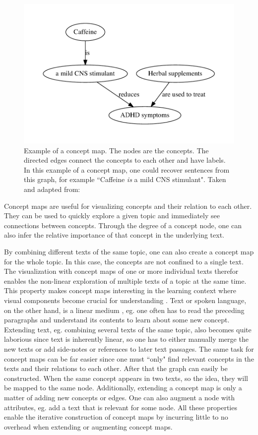 \begin{figure}[htb!]
\centering
\includegraphics[width=0.5\linewidth]{assets/figures/concept_map.pdf}
\caption[Example: Concept map]{Example of a concept map. The nodes are the concepts. The directed edges connect the concepts to each other and have labels. In this example of a concept map, one could recover sentences from this graph, for example ``Caffeine \textit{is} a mild CNS stimulant". Taken and adapted from: \cite{Falke2017b}}
\label{fig:concept_map}
\end{figure}

Concept maps are useful for visualizing concepts and their relation to each other.
They can be used to quickly explore a given topic and immediately see connections between concepts.
Through the degree of a concept node, one can also infer the relative importance of that concept in the underlying text.

By combining different texts of the same topic, one can also create a concept map for the whole topic.
In this case, the concepts are not confined to a single text.
The visualization with concept maps of one or more individual texts therefor enables the non-linear exploration of multiple texts of a topic at the same time.
This property makes concept maps interesting in the learning context where visual components become crucial for understanding \cite{Novak1984}.
Text or spoken language, on the other hand, is a linear medium \cite[p.~54]{Novak1984}, eg. one often has to read the preceding paragraphs and understand its contents to learn about some new concept.
Extending text, eg. combining several texts of the same topic, also becomes quite laborious since text is inherently linear, so one has to either manually merge the new texts or add side-notes or references to later text passages.
The same task for concept maps can be far easier since one must ``only" find relevant concepts in the texts and their relations to each other. After that the graph can easily be constructed.
When the same concept appears in two texts, so the idea, they will be mapped to the same node.
Additionally, extending a concept map is only a matter of adding new concepts or edges.
One can also augment a node with attributes, eg. add a text that is relevant for some node.
All these properties enable the iterative construction of concept maps by incurring little to no overhead when extending or augmenting concept maps.

